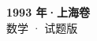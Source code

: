 \documentclass[zihao=-4, a4paper]{ctexart}
\begin{document}
\begin{center}
  {\Large\bfseries 1993 年·上海卷}\\[4pt]
  {\large 数学 · 试题版}
\end{center}
\medskip
{}

\end{document}
